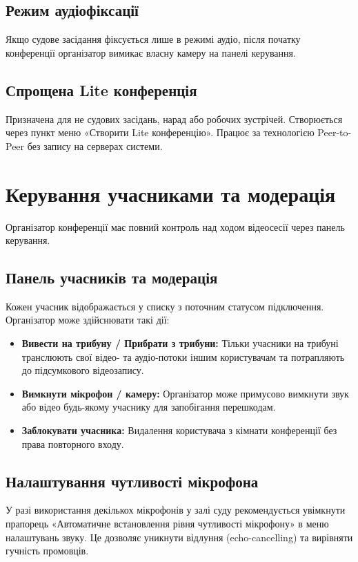 \documentclass{article}
\begin{document}
\subsection{Режим аудіофіксації}
Якщо судове засідання фіксується лише в режимі аудіо, після початку конференції організатор вимикає власну камеру на панелі керування.

\subsection{Спрощена Lite конференція}
Призначена для не судових засідань, нарад або робочих зустрічей. Створюється через пункт меню «Створити Lite конференцію». Працює за технологією Peer-to-Peer без запису на серверах системи.

\newpage

\section{Керування учасниками та модерація}

Організатор конференції має повний контроль над ходом відеосесії через панель керування.

\subsection{Панель учасників та модерація}
Кожен учасник відображається у списку з поточним статусом підключення. Організатор може здійснювати такі дії:
\begin{itemize}
    \item \textbf{Вивести на трибуну / Прибрати з трибуни:} Тільки учасники на трибуні транслюють свої відео- та аудіо-потоки іншим користувачам та потрапляють до підсумкового відеозапису.
    \item \textbf{Вимкнути мікрофон / камеру:} Організатор може примусово вимкнути звук або відео будь-якому учаснику для запобігання перешкодам.
    \item \textbf{Заблокувати учасника:} Видалення користувача з кімнати конференції без права повторного входу.
\end{itemize}

\subsection{Налаштування чутливості мікрофона}
У разі використання декількох мікрофонів у залі суду рекомендується увімкнути прапорець «Автоматичне встановлення рівня чутливості мікрофону» в меню налаштувань звуку. Це дозволяє уникнути відлуння (echo-cancelling) та вирівняти гучність промовців.
\end{document}
